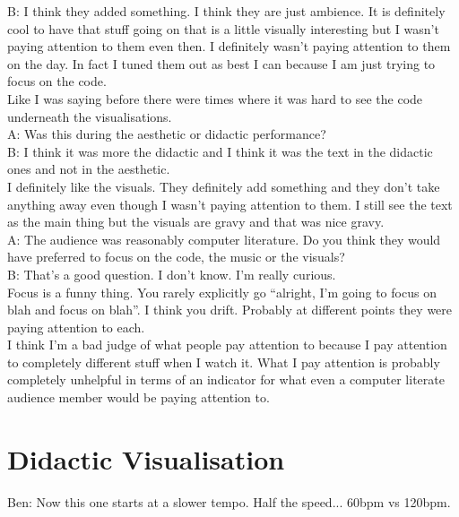 B: I think they added something. I think they are just ambience. It is definitely cool to have that stuff going on that is a little visually interesting but I wasn't paying attention to them even then. I definitely wasn't paying attention to them on the day. In fact I tuned them out as best I can because I am just trying to focus on the code.\\

Like I was saying before there were times where it was hard to see the code underneath the visualisations.\\

A: Was this during the aesthetic or didactic performance?\\

B: I think it was more the didactic and I think it was the text in the didactic ones and not in the aesthetic.\\

I definitely like the visuals. They definitely add something and they don't take anything away even though I wasn't paying attention to them. I still see the text as the main thing but the visuals are gravy and that was nice gravy.\\

A: The audience was reasonably computer literature. Do you think they would have preferred to focus on the code, the music or the visuals?\\

B: That's a good question. I don't know. I'm really curious.\\

Focus is a funny thing. You rarely explicitly go ``alright, I'm going to focus on blah and focus on blah''. I think you drift. Probably at different points they were paying attention to each.\\

I think I'm a bad judge of what people pay attention to because I pay attention to completely different stuff when I watch it. What I pay attention is probably completely unhelpful in terms of an indicator for what even a computer literate audience member would be paying attention to.\\

\section*{Didactic Visualisation}

Ben: Now this one starts at a slower tempo. Half the speed... 60bpm vs 120bpm.\\

